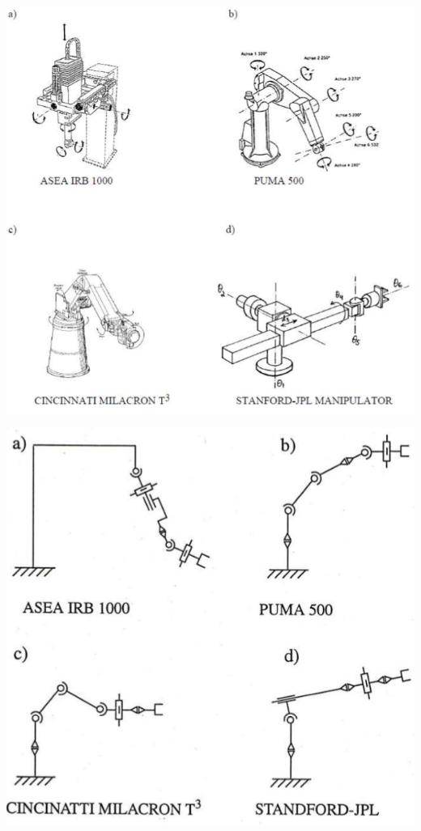 \begin{minipage}{0.5\linewidth}
\includegraphics[width=0.8\linewidth]{./bilder/KinAuf.png}
\end{minipage}
\begin{minipage}{0.5\linewidth}
\includegraphics[width=0.8\linewidth]{./bilder/KinAufL.png}
\end{minipage}

